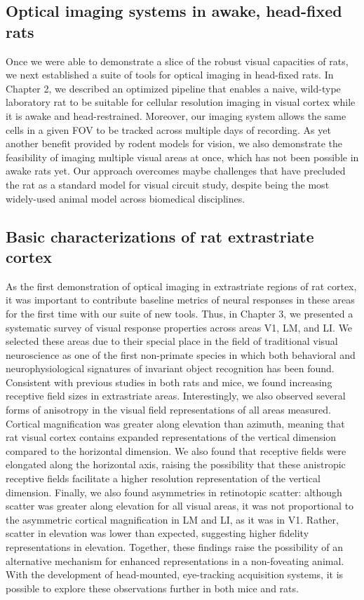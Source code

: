 \subsection{Optical imaging systems in awake, head-fixed rats}
Once we were able to demonstrate a slice of the robust visual capacities of rats, we next established a suite of tools for optical imaging in head-fixed rats. In Chapter 2, we described an optimized pipeline that enables a naive, wild-type laboratory rat to be suitable for cellular resolution imaging in visual cortex while it is awake and head-restrained. Moreover, our imaging system allows the same cells in a given FOV to be tracked across multiple days of recording. As yet another benefit provided by rodent models for vision, we also demonstrate the feasibility of imaging multiple visual areas at once, which has not been possible in awake rats yet. Our approach overcomes maybe challenges that have precluded the rat as a standard model for visual circuit study, despite being the most widely-used animal model across biomedical disciplines. 

\subsection{Basic characterizations of rat extrastriate cortex}
As the first demonstration of optical imaging in extrastriate regions of rat cortex, it was important to contribute baseline metrics of neural responses in these areas for the first time with our suite of new tools. Thus, in Chapter 3, we presented a systematic survey of visual response properties across areas V1, LM, and LI. We selected these areas due to their special place in the field of traditional visual neuroscience as one of the first non-primate species in which both behavioral and neurophysiological signatures of invariant object recognition has been found. Consistent with previous studies in both rats and mice, we found increasing receptive field sizes in extrastriate areas. Interestingly, we also observed several forms of anisotropy in the visual field representations of all areas measured. Cortical magnification was greater along elevation than azimuth, meaning that rat visual cortex contains expanded representations of the vertical dimension compared to the horizontal dimension. We also found that receptive fields were elongated along the horizontal axis, raising the possibility that these anistropic receptive fields facilitate a higher resolution representation of the vertical dimension. Finally, we also found asymmetries in retinotopic scatter: although scatter was greater along elevation for all visual areas, it was not proportional to the asymmetric cortical magnification in LM and LI, as it was in V1. Rather, scatter in elevation was lower than expected, suggesting higher fidelity representations in elevation. Together, these findings raise the possibility of an alternative mechanism for enhanced representations in a non-foveating animal. With the development of head-mounted, eye-tracking acquisition systems\cite{Meyer2020, Michaiel2020}, it is possible to explore these observations further in both mice and rats. 

